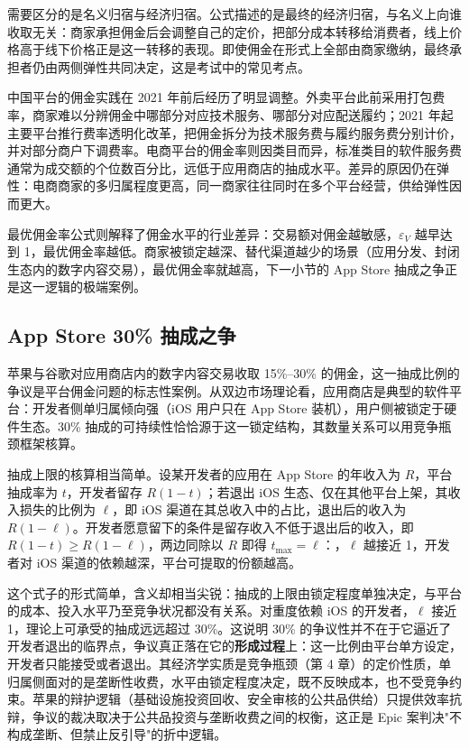 需要区分的是名义归宿与经济归宿。公式描述的是最终的经济归宿，与名义上向谁收取无关：商家承担佣金后会调整自己的定价，把部分成本转移给消费者，线上价格高于线下价格正是这一转移的表现。即使佣金在形式上全部由商家缴纳，最终承担者仍由两侧弹性共同决定，这是考试中的常见考点。

中国平台的佣金实践在 2021 年前后经历了明显调整。外卖平台此前采用打包费率，商家难以分辨佣金中哪部分对应技术服务、哪部分对应配送履约；2021 年起主要平台推行费率透明化改革，把佣金拆分为技术服务费与履约服务费分别计价，并对部分商户下调费率。电商平台的佣金率则因类目而异，标准类目的软件服务费通常为成交额的个位数百分比，远低于应用商店的抽成水平。差异的原因仍在弹性：电商商家的多归属程度更高，同一商家往往同时在多个平台经营，供给弹性因而更大。

最优佣金率公式则解释了佣金水平的行业差异：交易额对佣金越敏感，$\varepsilon_V$ 越早达到 1，最优佣金率越低。商家被锁定越深、替代渠道越少的场景（应用分发、封闭生态内的数字内容交易），最优佣金率就越高，下一小节的 App Store 抽成之争正是这一逻辑的极端案例。

\subsection{App Store 30\% 抽成之争}

苹果与谷歌对应用商店内的数字内容交易收取 15\%–30\% 的佣金，这一抽成比例的争议是平台佣金问题的标志性案例。从双边市场理论看，应用商店是典型的软件平台：开发者侧单归属倾向强（iOS 用户只在 App Store 装机），用户侧被锁定于硬件生态。30\% 抽成的可持续性恰恰源于这一锁定结构，其数量关系可以用竞争瓶颈框架核算。

抽成上限的核算相当简单。设某开发者的应用在 App Store 的年收入为 $R$，平台抽成率为 $t$，开发者留存 $R(1-t)$；若退出 iOS 生态、仅在其他平台上架，其收入损失的比例为 $\ell$，即 iOS 渠道在其总收入中的占比，退出后的收入为 $R(1-\ell)$。开发者愿意留下的条件是留存收入不低于退出后的收入，即 $R(1-t) \geq R(1-\ell)$，两边同除以 $R$ 即得 $t_{\max} = \ell$：，$\ell$ 越接近 1，开发者对 iOS 渠道的依赖越深，平台可提取的份额越高。

这个式子的形式简单，含义却相当尖锐：抽成的上限由锁定程度单独决定，与平台的成本、投入水平乃至竞争状况都没有关系。对重度依赖 iOS 的开发者，$\ell$ 接近 1，理论上可承受的抽成远远超过 30\%。这说明 30\% 的争议性并不在于它逼近了开发者退出的临界点，争议真正落在它的\textbf{形成过程}上：这一比例由平台单方设定，开发者只能接受或者退出。其经济学实质是竞争瓶颈（第 4 章）的定价性质，单归属侧面对的是垄断性收费，水平由锁定程度决定，既不反映成本，也不受竞争约束。苹果的辩护逻辑（基础设施投资回收、安全审核的公共品供给）只提供效率抗辩，争议的裁决取决于公共品投资与垄断收费之间的权衡，这正是 Epic 案判决"不构成垄断、但禁止反引导"的折中逻辑。

